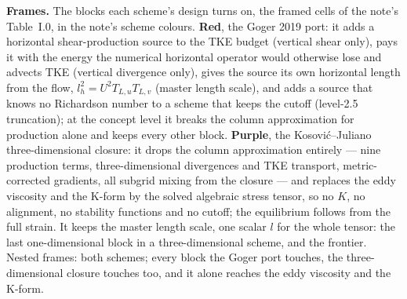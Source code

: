 \documentclass[10pt]{article}
\begin{document}
\vspace{0.2ex}
{\footnotesize\textbf{Frames.} The blocks each scheme's design turns on, the framed cells of the note's Table~I.0,
in the note's scheme colours. \textcolor{cGXIX}{\textbf{Red}}, the Goger 2019 port: it adds a horizontal
shear-production source to the TKE budget (vertical shear only), pays it with the energy the numerical
horizontal operator would otherwise lose and advects TKE (vertical divergence only), gives the source its own
horizontal length from the flow, $l_h^2 = U^2 T_{L,u} T_{L,v}$ (master length scale), and adds a source that knows no
Richardson number to a scheme that keeps the cutoff (level-2.5 truncation); at the concept level it breaks the
column approximation for production alone and keeps every other block. \textcolor{cFULL}{\textbf{Purple}}, the
Kosovi\'c--Juliano three-dimensional closure: it drops the column approximation entirely --- nine production
terms, three-dimensional divergences and TKE transport, metric-corrected gradients, all subgrid mixing from the
closure --- and replaces the eddy viscosity and the K-form by the solved algebraic stress tensor, so no $K$, no
alignment, no stability functions and no cutoff; the equilibrium follows from the full strain. It keeps the master
length scale, one scalar $l$ for the whole tensor: the last one-dimensional block in a three-dimensional scheme, and
the frontier. Nested frames: both schemes; every block the Goger port touches, the three-dimensional closure touches
too, and it alone reaches the eddy viscosity and the K-form.\par}
\end{document}
